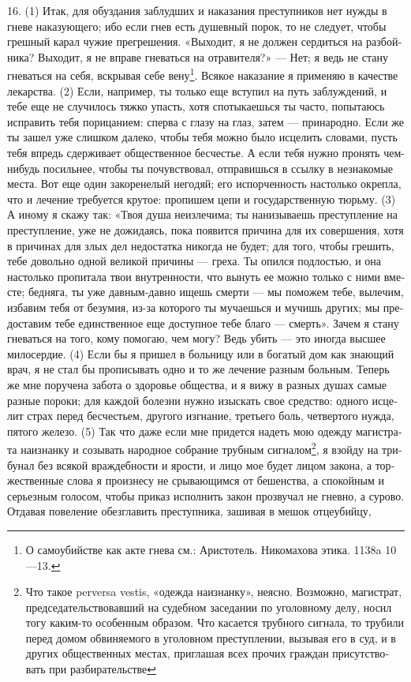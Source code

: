 16. (1) Итак, для обузда­ния заблуд­ших и нака­за­ния пре­ступ­ни­ков нет нуж­ды в гне­ве нака­зу­ю­ще­го; ибо если гнев есть душев­ный порок, то не сле­ду­ет, чтобы греш­ный карал чужие пре­гре­ше­ния. «Выхо­дит, я не дол­жен сер­дить­ся на раз­бой­ни­ка? Выхо­дит, я не впра­ве гне­вать­ся на отра­ви­те­ля?» --- Нет; я ведь не ста­ну гне­вать­ся на себя, вскры­вая себе вену\footnote{О само­убий­стве как акте гне­ва см.: Ари­сто­тель. Нико­ма­хо­ва эти­ка. 1138a 10—13.}. Вся­кое нака­за­ние я при­ме­няю в каче­стве лекар­ства. (2) Если, напри­мер, ты толь­ко еще всту­пил на путь заблуж­де­ний, и тебе еще не слу­чи­лось тяж­ко упасть, хотя споты­ка­ешь­ся ты часто, попы­та­юсь испра­вить тебя пори­ца­ни­ем: спер­ва с гла­зу на глаз, затем --- при­на­род­но. Если же ты зашел уже слиш­ком дале­ко, чтобы тебя мож­но было исце­лить сло­ва­ми, пусть тебя впредь сдер­жи­ва­ет обще­ст­вен­ное бес­че­стье. А если тебя нуж­но про­нять чем-нибудь посиль­нее, чтобы ты почув­ст­во­вал, отпра­вишь­ся в ссыл­ку в незна­ко­мые места. Вот еще один зако­ре­не­лый него­дяй; его испор­чен­ность настоль­ко окреп­ла, что и лече­ние тре­бу­ет­ся кру­тое: про­пи­шем цепи и государ­ст­вен­ную тюрь­му. (3) А ино­му я ска­жу так: «Твоя душа неиз­ле­чи­ма; ты нани­зы­ва­ешь пре­ступ­ле­ние на пре­ступ­ле­ние, уже не дожи­да­ясь, пока появит­ся при­чи­на для их совер­ше­ния, хотя в при­чи­нах для злых дел недо­стат­ка нико­гда не будет; для того, чтобы гре­шить, тебе доволь­но одной вели­кой при­чи­ны --- греха. Ты опил­ся под­ло­стью, и она настоль­ко про­пи­та­ла твои внут­рен­но­сти, что вынуть ее мож­но толь­ко с ними вме­сте; бед­ня­га, ты уже дав­ным-дав­но ищешь смер­ти --- мы помо­жем тебе, выле­чим, изба­вим тебя от безу­мия, из-за кото­ро­го ты муча­ешь­ся и мучишь дру­гих; мы пре­до­ста­вим тебе един­ст­вен­ное еще доступ­ное тебе бла­го --- смерть». Зачем я ста­ну гне­вать­ся на того, кому помо­гаю, чем могу? Ведь убить --- это ино­гда выс­шее мило­сер­дие. (4) Если бы я при­шел в боль­ни­цу или в бога­тый дом как знаю­щий врач, я не стал бы про­пи­сы­вать одно и то же лече­ние раз­ным боль­ным. Теперь же мне пору­че­на забота о здо­ро­вье обще­ства, и я вижу в раз­ных душах самые раз­ные поро­ки; для каж­дой болез­ни нуж­но изыс­кать свое сред­ство: одно­го исце­лит страх перед бес­че­стьем, дру­го­го изгна­ние, третье­го боль, чет­вер­то­го нуж­да, пято­го желе­зо. (5) Так что даже если мне при­дет­ся надеть мою одеж­ду маги­ст­ра­та наизнан­ку и созы­вать народ­ное собра­ние труб­ным сигналом\footnote{Что такое perversa vestis, «одеж­да наизнан­ку», неяс­но. Воз­мож­но, маги­ст­рат, пред­седа­тель­ст­во­вав­ший на судеб­ном заседа­нии по уго­лов­но­му делу, носил тогу каким-то осо­бен­ным обра­зом. Что каса­ет­ся труб­но­го сиг­на­ла, то тру­би­ли перед домом обви­ня­е­мо­го в уго­лов­ном пре­ступ­ле­нии, вызы­вая его в суд, и в дру­гих обще­ст­вен­ных местах, при­гла­шая всех про­чих граж­дан при­сут­ст­во­вать при раз­би­ра­тель­стве}, я взой­ду на три­бу­нал без вся­кой враж­деб­но­сти и яро­сти, и лицо мое будет лицом зако­на, а тор­же­ст­вен­ные сло­ва я про­из­не­су не сры­ваю­щим­ся от бешен­ства, а спо­кой­ным и серь­ез­ным голо­сом, чтобы при­каз испол­нить закон про­зву­чал не гнев­но, а суро­во. Отда­вая пове­ле­ние обез­гла­вить пре­ступ­ни­ка, заши­вая в мешок отце­убий­цу, 